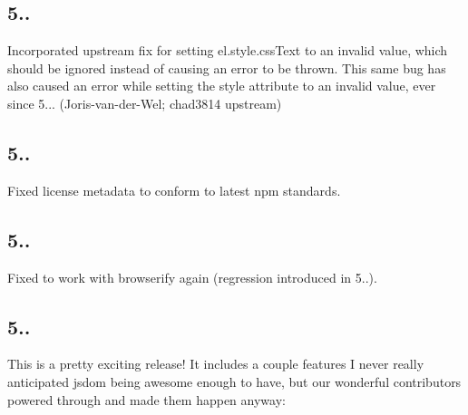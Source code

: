 \subsection*{5..}


\begin{DoxyItemize}
\item Incorporated upstream fix for setting {\ttfamily el.\+style.\+css\+Text} to an invalid value, which should be ignored instead of causing an error to be thrown. This same bug has also caused an error while setting the style attribute to an invalid value, ever since 5... (Joris-\/van-\/der-\/\+Wel; chad3814 upstream)
\end{DoxyItemize}

\subsection*{5..}


\begin{DoxyItemize}
\item Fixed license metadata to conform to latest npm standards.
\end{DoxyItemize}

\subsection*{5..}


\begin{DoxyItemize}
\item Fixed to work with browserify again (regression introduced in 5..).
\end{DoxyItemize}

\subsection*{5..}

This is a pretty exciting release! It includes a couple features I never really anticipated jsdom being awesome enough to have, but our wonderful contributors powered through and made them happen anyway\+:



